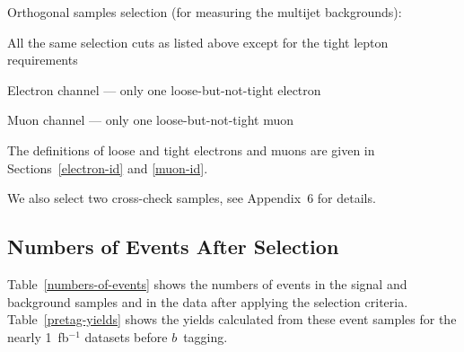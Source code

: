 Orthogonal samples selection (for measuring the multijet backgrounds):
\vspace{-0.07in}
\begin{myitemize}
\item All the same selection cuts as listed above except for the
tight lepton requirements
\item Electron channel --- only one loose-but-not-tight electron
\item Muon channel --- only one loose-but-not-tight muon
\end{myitemize}
\vspace{-0.07in}
The definitions of loose and tight electrons and muons are given in
Sections~\ref{electron-id} and \ref{muon-id}.

\noindent We also select two cross-check samples, see Appendix~6 for
details.

\clearpage

\subsection{Numbers of Events After Selection}
\label{event-numbers}

Table~\ref{numbers-of-events} shows the numbers of events in the signal
and background samples and in the data after applying the selection
criteria. Table~\ref{pretag-yields} shows the yields calculated from
these event samples for the nearly 1~fb$^{-1}$ datasets before
$b$~tagging.

